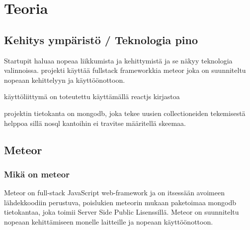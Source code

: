 \documentclass[11pt,a4paper,titlepage,oneside]{article}
\begin{document}
\newpage
\section{Teoria}                %



\subsection{Kehitys ympäristö / Teknologia pino}

Startupit haluaa nopeaa liikkumista ja kehittymistä ja se näkyy teknologia valinnoissa.
projekti käyttää fullstack frameworkkia meteor joka on suunniteltu nopeaan kehittelyyn ja käyttöönottoon.
\medskip

käyttöliittymä on toteutettu käyttämällä reactjs kirjastoa
\medskip

projektin tietokanta on mongodb, joka tekee uusien collectioneiden tekemisestä helppoa sillä nosql kantoihin ei travitse määritellä skeemaa.
\medskip










\newpage
\subsection{Meteor}                %



\subsubsection{Mikä on meteor}









Meteor on full-stack JavaScript web-framework ja on itsessään avoimeen lähdekkoodiin perustuva, 
poislukien meteorin mukaan paketoimaa mongodb tietokantaa, joka toimii Server Side Public Lisenssillä.
Meteor on suunniteltu nopeaan kehittämiseen monelle laitteille ja nopeaan käyttöönottoon.
%
\medskip
\end{document}

